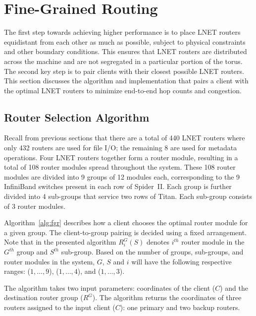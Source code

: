 \section{Fine-Grained Routing}

The first step towards achieving higher performance is to place LNET routers
equidistant from each other as much as possible, subject to physical
constraints and other boundary conditions. This ensures that LNET routers are
distributed across the machine and are not segregated in a particular portion of the torus. The
second key step is to pair clients with their closest possible LNET routers.
This section discusses the algorithm and implementation that pairs a client
with the optimal LNET routers to minimize end-to-end hop counts and congestion.

\subsection{Router Selection Algorithm}
Recall from previous sections that there are a total of 440 LNET routers where
only 432 routers are used for file I/O; the remaining 8 are used for metadata
operations. Four LNET routers together form a router module, resulting in a
total of 108 router modules spread throughout the system. These 108 router
modules are divided into 9 groups of 12 modules each, corresponding to the 9
InfiniBand switches present in each row of Spider~II.  Each group is further
divided into 4 sub-groups that service two rows of Titan. Each sub-group
consists of 3 router modules.

Algorithm~\ref{alg:fgr} describes how a client chooses the optimal router
module for a given group. The client-to-group pairing is decided using a fixed
arrangement.  Note that in the presented algorithm $R^G_{i}(S)$ denotes
$i^{th}$ router module in the $G^{th}$ group and $S^{th}$ sub-group. Based on
the number of groups, sub-groups, and router modules in the system, $G$, $S$
and $i$ will have the following respective ranges: ($1, \dots, 9$), ($1, \dots,
4$), and ($1, \dots, 3$).


The algorithm takes two input parameters: coordinates of the client ($C$) and
the destination router group ($R^G$). The algorithm returns the coordinates of
three routers assigned to the input client ($C$): one primary and two backup
routers. 

